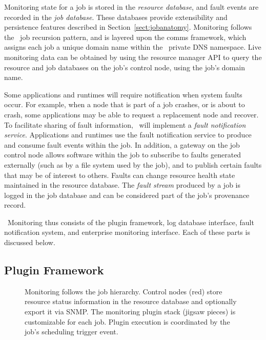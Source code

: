 Monitoring state for a job is stored in the {\em resource database}, and
fault events are recorded in the {\em job database}.
These databases provide extensibility and persistence features described
in Section~\ref{sect:jobanatomy}.
Monitoring follows the \ngrm\ job recursion pattern, and is layered upon
the comms framework, which assigns each job a unique domain name within
the \ngrm\ private DNS namespace.
Live monitoring data can be obtained by using the resource
manager API to query the resource and job databases on the job's control
node, using the job's domain name.

Some applications and runtimes will require notification when system faults
occur.  For example, when a node that is part of a job crashes, or is about to
crash, some applications may be able to request a replacement node and recover.
To facilitate sharing of fault information, \ngrm\ will implement a
{\em fault notification service}.
Applications and runtimes use the fault notification service to produce
and consume fault events within the job.  In addition, a gateway on the
job control node allows software within the job to subscribe to faults
generated externally (such as by a file system used by the job), and to
publish certain faults that may be of interest to others.
Faults can change resource health state maintained in the resource database.
The {\em fault stream} produced by a job is logged in the job database
and can be considered part of the job's provenance record.

\ngrm\ Monitoring thus consists of
the plugin framework, 
log database interface,
fault notification system, and
enterprise monitoring interface.
Each of these parts is discussed below.

\subsection{Plugin Framework}

\begin{figure}
\begin{minipage}[b]{0.4\linewidth}
\end{minipage}
\hspace{1cm}
\begin{minipage}[b]{0.4\linewidth}
\end{minipage}
\caption{Monitoring follows the job hierarchy.
Control nodes (red) store resource status information in the resource
database and optionally export it via SNMP.
The monitoring plugin stack (jigsaw pieces) is customizable for each job.
Plugin execution is coordinated by the job's scheduling trigger event.}
\label{FigMonEx1}
\end{figure}

